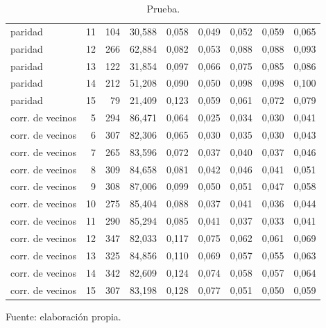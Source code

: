 \begin{table}[htbp]
{\begin{tabular}{@{}lrrrrrrrr@{}}
        paridad & 11 & 104 & 30,588 & 0,058 & 0,049 & 0,052 & 0,059 & 0,065 \\
        paridad & 12 & 266 & 62,884 & 0,082 & 0,053 & 0,088 & 0,088 & 0,093 \\
        paridad & 13 & 122 & 31,854 & 0,097 & 0,066 & 0,075 & 0,085 & 0,086 \\
        paridad & 14 & 212 & 51,208 & 0,090 & 0,050 & 0,098 & 0,098 & 0,100 \\
        paridad & 15 & 79 & 21,409 & 0,123 & 0,059 & 0,061 & 0,072 & 0,079 \\
        corr. de vecinos & 5 & 294 & 86,471 & 0,064 & 0,025 & 0,034 & 0,030 & 0,041 \\
        corr. de vecinos & 6 & 307 & 82,306 & 0,065 & 0,030 & 0,035 & 0,030 & 0,043 \\
        corr. de vecinos & 7 & 265 & 83,596 & 0,072 & 0,037 & 0,040 & 0,037 & 0,046 \\
        corr. de vecinos & 8 & 309 & 84,658 & 0,081 & 0,042 & 0,046 & 0,041 & 0,051 \\
        corr. de vecinos & 9 & 308 & 87,006 & 0,099 & 0,050 & 0,051 & 0,047 & 0,058 \\
        corr. de vecinos & 10 & 275 & 85,404 & 0,088 & 0,037 & 0,041 & 0,036 & 0,044 \\
        corr. de vecinos & 11 & 290 & 85,294 & 0,085 & 0,041 & 0,037 & 0,033 & 0,041 \\
        corr. de vecinos & 12 & 347 & 82,033 & 0,117 & 0,075 & 0,062 & 0,061 & 0,069 \\
        corr. de vecinos & 13 & 325 & 84,856 & 0,110 & 0,069 & 0,057 & 0,055 & 0,063 \\
        corr. de vecinos & 14 & 342 & 82,609 & 0,124 & 0,074 & 0,058 & 0,057 & 0,064 \\
        corr. de vecinos & 15 & 307 & 83,198 & 0,128 & 0,077 & 0,051 & 0,050 & 0,059 \\
        \bottomrule
    \end{tabular}}

    \caption{Prueba.}
    \label{tab:e_tamano_mae_f}

    {\footnotesize Fuente: elaboración propia.}
\end{table}
